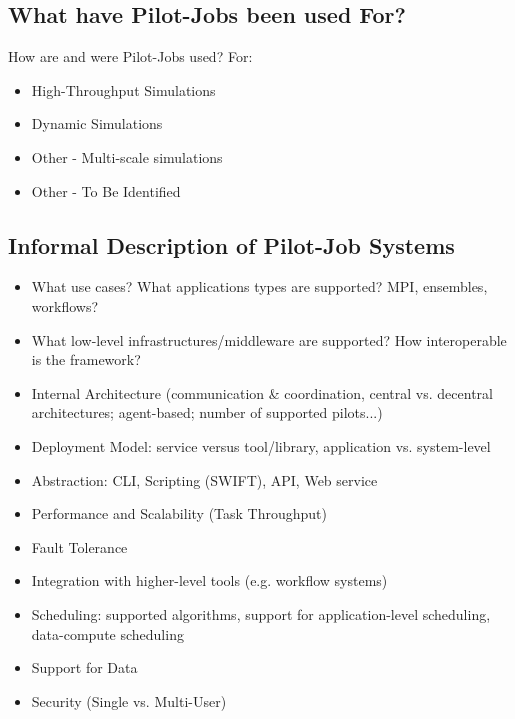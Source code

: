 \documentclass{sig-alternate}
\begin{document}
\subsection{What have Pilot-Jobs been used For?}

How are and were Pilot-Jobs used?
For:
\begin{itemize}
\item High-Throughput Simulations
\item Dynamic Simulations
\item Other - Multi-scale simulations  
\item Other - To Be Identified
\end{itemize}

\subsection{Informal Description of Pilot-Job Systems}


\begin{itemize}
	\item What use cases? What applications types are supported? MPI, ensembles, workflows?
	\item What low-level infrastructures/middleware are supported? How interoperable is the framework?
	\item Internal Architecture (communication \& coordination, central vs. decentral architectures; agent-based; number of supported pilots...)
	\item Deployment Model: service versus tool/library, application vs. system-level
    \item Abstraction: CLI, Scripting (SWIFT), API, Web service
	\item Performance and Scalability (Task Throughput)
	\item Fault Tolerance
	\item Integration with higher-level tools (e.g. workflow systems)
	\item Scheduling: supported algorithms, support for application-level 
	scheduling, data-compute scheduling
	\item Support for Data
	\item Security (Single vs. Multi-User)
\end{itemize}
\end{document}
